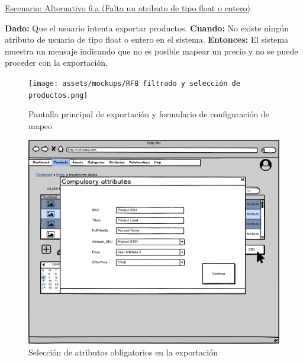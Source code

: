 \underline{Escenario: Alternativo 6.a (Falta un atributo de tipo float o entero)}\par
\textbf{Dado:} Que el usuario intenta exportar productos.  
\textbf{Cuando:} No existe ningún atributo de usuario de tipo float o entero en el sistema.  
\textbf{Entonces:} El sistema muestra un mensaje indicando que no es posible mapear un precio y no se puede proceder con la exportación.\par

\begin{figure}[H]
    \texttt{[image: assets/mockups/RF8 filtrado y selección de productos.png]}
    \caption{Pantalla principal de exportación y formulario de configuración de mapeo}
\end{figure}


\begin{figure}[H]
    \includegraphics[width=1\linewidth]{assets/mockups/RF8 Seleccion de atributos obligatorios.png}
    \caption{Selección de atributos obligatorios en la exportación}
\end{figure}

